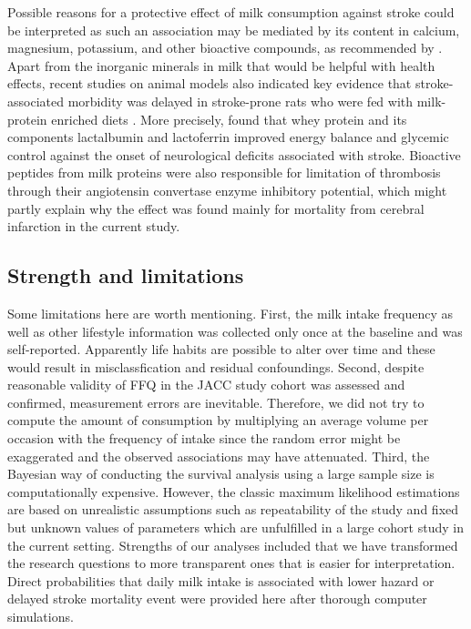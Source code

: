 \documentclass[nutrients,article,submitted,moreauthors,pdftex]{mdpi}
\begin{document}
Possible reasons for a protective effect of milk consumption against
stroke could be interpreted as such an association may be mediated by
its content in calcium, magnesium, potassium, and other bioactive
compounds, as recommended by \citet{Iacoviello2018}. Apart from the
inorganic minerals in milk that would be helpful with health effects,
recent studies on animal models also indicated key evidence that
stroke-associated morbidity was delayed in stroke-prone rats who were
fed with milk-protein enriched diets \citep{Chiba2012, singh2016diets}.
More precisely, \citet{Singh2020} found that whey protein and its
components lactalbumin and lactoferrin improved energy balance and
glycemic control against the onset of neurological deficits associated
with stroke. Bioactive peptides from milk proteins were also responsible
for limitation of thrombosis \citep{tokajuk2019whey} through their
angiotensin convertase enzyme inhibitory potential, which might partly
explain why the effect was found mainly for mortality from cerebral
infarction in the current study.

\hypertarget{strength-and-limitations}{%
\subsection{Strength and limitations}\label{strength-and-limitations}}

Some limitations here are worth mentioning. First, the milk intake
frequency as well as other lifestyle information was collected only once
at the baseline and was self-reported. Apparently life habits are
possible to alter over time and these would result in misclassfication
and residual confoundings. Second, despite reasonable validity of FFQ in
the JACC study cohort was assessed and confirmed, measurement errors are
inevitable. Therefore, we did not try to compute the amount of
consumption by multiplying an average volume per occasion with the
frequency of intake since the random error might be exaggerated and the
observed associations may have attenuated. Third, the Bayesian way of
conducting the survival analysis using a large sample size is
computationally expensive. However, the classic maximum likelihood
estimations are based on unrealistic assumptions such as repeatability
of the study and fixed but unknown values of parameters which are
unfulfilled in a large cohort study in the current setting. Strengths of
our analyses included that we have transformed the research questions to
more transparent ones that is easier for interpretation. Direct
probabilities that daily milk intake is associated with lower hazard or
delayed stroke mortality event were provided here after thorough
computer simulations.
\end{document}
